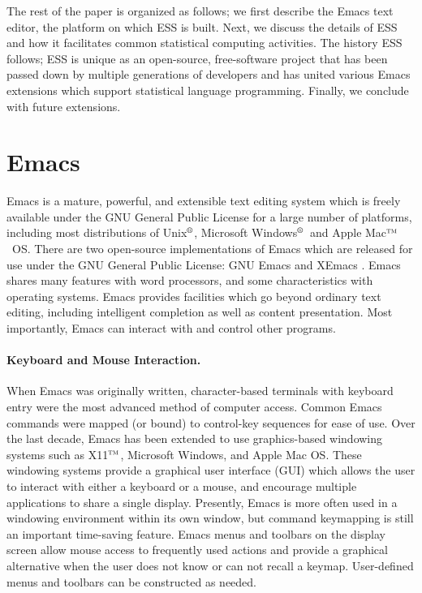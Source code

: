 \documentclass{article}
\newcommand*{\regstrd}{$^{\mbox{\scriptsize{\textregistered}}}$}
\newcommand*{\tm}{$^{\mbox{\scriptsize\sc tm}}$}
\begin{document}
The rest of the paper is organized as follows; we first describe the
Emacs text editor, the platform on which ESS is built.  Next, we
discuss the details of ESS and how it facilitates common statistical
computing activities.  The history ESS follows; ESS is unique as an
open-source, free-software project that has been passed down by
multiple generations of developers and has united various Emacs
extensions which support statistical language programming.  Finally,
we conclude with future extensions.

\section{Emacs}
\label{sec:emacs}

Emacs is a mature, powerful, and extensible text editing system which
is freely available under the GNU General Public License for a large
number of platforms, including most distributions of Unix\regstrd, Microsoft
Windows\regstrd\ and Apple Mac\tm\ OS.  There are two open-source
implementations of Emacs which are released for use under the GNU
General Public License: GNU Emacs \citep{GNU-Emacs} and XEmacs
\citep{XEmacs}.  Emacs shares many features with word processors, and
some characteristics with operating systems.
Emacs provides facilities which go beyond ordinary text editing, including intelligent completion as well as content presentation.
Most importantly, Emacs can interact with and control other programs.

\paragraph{Keyboard and Mouse Interaction.}
When Emacs was originally written, character-based terminals with
keyboard entry were the most advanced method of computer access.
Common Emacs commands were mapped (or bound) to control-key sequences
for ease of use.  Over the last decade, Emacs has been extended to use
graphics-based windowing systems such as X11\tm, Microsoft Windows,
and Apple Mac OS.  These windowing systems provide a graphical user
interface (GUI) which allows the user to interact with either a
keyboard or a mouse, and encourage multiple applications to share a
single display.  Presently, Emacs is more often used in a windowing
environment within its own window, but command keymapping is still an
important time-saving feature.  Emacs menus and toolbars on the
display screen allow mouse access to frequently used actions and
provide a graphical alternative when the user does not know or can not
recall a keymap.  User-defined menus and toolbars can be constructed
as needed.
\end{document}
